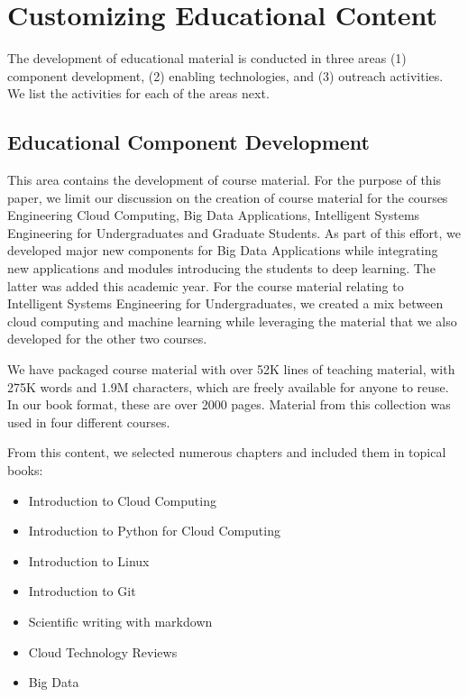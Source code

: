 \documentclass[conference]{IEEEtran}
\begin{document}
\section{Customizing Educational Content}

The development of educational material is conducted in three areas (1) component development, (2) enabling technologies,  and (3) outreach activities. We list the activities for each of the areas next.

\subsection{Educational Component Development}

This area contains the development of course material. For the purpose
of this paper, we limit our discussion on the creation of course material
for the courses Engineering Cloud Computing,  Big Data Applications,
Intelligent Systems Engineering for Undergraduates and Graduate
Students. As part of this effort, we developed major new components for
Big Data Applications while integrating new applications and modules
introducing the students to deep learning. The latter was added this
academic year. For the course material relating to Intelligent Systems
Engineering for Undergraduates, we created a mix between cloud
computing and machine learning while leveraging the material that we
also developed for the other two courses.

We have packaged course material with over 52K lines of teaching
material, with 275K words and 1.9M characters, which are freely
available for anyone to reuse. In our book format, these are over 2000
pages. Material from this collection was used in four different
courses.

From this content, we selected numerous chapters and included them in
topical books:

\begin{itemize}
\item  Introduction to Cloud Computing \cite{las20book-cloudeng}
  
\item   Introduction to Python for Cloud Computing \cite{las20book-python}
  
\item  Introduction to Linux \cite{las20book-linux}
  
\item  Introduction to Git

\item Scientific writing with markdown  \cite{las20book-markdown}

\item Cloud Technology Reviews \cite{las20book-tech}

\item Big Data \cite{las20book-bigdata}
  
\end{itemize}
\end{document}
